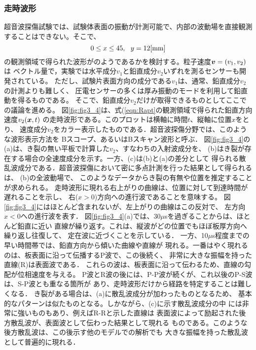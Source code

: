 \subsubsection{走時波形}
超音波探傷試験では、試験体表面の振動が計測可能で、内部の波動場を直接観測
することはできない。そこで、
\begin{equation}
	0\leq x \leq 45 , \ \ y=12[{\rm mm}]
	\label{eqn:Rapt}
\end{equation}
の観測領域で得られた波形がのようであるかを検討する。粒子速度$\mbox{\boldmath $v$}=(v_1, v_2)$は
ベクトル量で，実験では水平成分$v_1$と鉛直成分$v_2$いずれを測るセンサーも開発されている。
ただし、試験片表面方向の成分である$v_1$は、通常、鉛直成分$v_2$の計測よりも難しく、
圧電センサーの多くは厚み振動のモードを利用して鉛直動を得るものである。
そこで、鉛直成分$v_2$だけが取得できるものとしてここでの議論を進める。
図\ref{fig:fig3_4}は、式(\ref{eqn:Rapt}の観測領域で得られた鉛直方向速度$v_2(\mbox{\boldmath $x$},t)$
の走時波形である。このプロットは横軸に時間$t$、縦軸に位置$x$をとり、
速度成分$v_2$をカラー表示したものである．超音波探傷分野では、このような波形表示方法を
Bスコープ、あるいはBスキャン波形と呼ぶ．
図\ref{fig:fig3_4}の(a)は、き裂の無い平板で計算した$v_2$、すなわちの入射波成分を、
(b)はき裂が存在する場合の全速度成分を示す。一方、(c)は(b)と(a)の差分として
得られる散乱波成分である．超音波探傷において密に多点計測を行った結果として得られるは、
(b)の全波動場で、 このようなデータからき裂の有無や位置を推定することが求められる。
走時波形に現れる右上がりの曲線は、位置に対して到達時間が遅れることを示し、
右($x>0$)方向への進行波であることを意味する。
図\ref{fig:fig3_4}にはほとんど含まれないが、左上がりの曲線はこの反対で、
左方向$x<0$への進行波を表す．
図\ref{fig:fig3_4}(a)では、30$\mu$sを過ぎることからは、ほとんど鉛直に近い
直線が繰り返す。これは、縦波がどの位置でもほぼ板厚方向へ繰り返し往復して、
定在波に近づくことを示している．
一方、10$\mu$s程度までの早い時間帯では、鉛直方向から傾いた曲線や直線が
現れる。一番はやく現れるのは、板表面に沿って伝播するP波で、この後続く、
非常に大きな振幅を持った直線(R)は表面波である．
これらの波は、板表面に沿って伝わるため、直線の勾配が位相速度を与える。
P波とR波の後には、P-P波が続くが、これ以後のP-S波は、S-P波とも重なる箇所が
あり、走時波形だけから経路を特定することは難しくなる．
き裂がある場合は、(a)に散乱波成分が加わったものとなるため、
基本的なパターンは似たものとなる。しかながら、(c)に示す散乱波成分の中
には非常に強いものもあり、例えばR-Rと示した直線は
表面波によって励起された後方散乱波が、表面波として伝わった結果として現れる
ものである。このような後方散乱波は、この後示す他のモデルでの解析でも
大きな振幅を持った散乱波として普遍的に現れる．
